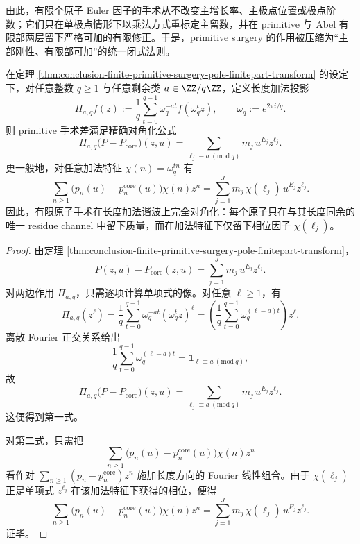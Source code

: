 \noindent
由此，有限个原子 Euler 因子的手术从不改变主增长率、主极点位置或极点阶数；它们只在单极点情形下以乘法方式重标定主留数，并在 primitive 与 Abel 有限部两层留下严格可加的有限修正。于是，primitive surgery 的作用被压缩为“主部刚性、有限部可加”的统一闭式法则。

\begin{theorem}[有限原子手术在长度加法谐波上的完全对角化]\label{thm:conclusion-finite-primitive-surgery-additive-harmonic-diagonalization}
在定理 \ref{thm:conclusion-finite-primitive-surgery-pole-finitepart-transform} 的设定下，对任意整数 \(q\ge 1\) 与任意剩余类 \(a\in \ZZ/q\ZZ\)，定义长度加法投影
\[
\Pi_{a,q}f(z):=\frac{1}{q}\sum_{t=0}^{q-1}\omega_q^{-at}f(\omega_q^t z),
\qquad
\omega_q:=e^{2\pi i/q}.
\]
则 primitive 手术差满足精确对角化公式
\[
\Pi_{a,q}\!\bigl(P-P_{\mathrm{core}}\bigr)(z,u)
=
\sum_{\ell_j\equiv a\ (\mathrm{mod}\ q)}m_j\,u^{E_j}z^{\ell_j}.
\]
更一般地，对任意加法特征 \(\chi(n)=\omega_q^{tn}\) 有
\[
\sum_{n\ge 1}\bigl(p_n(u)-p_n^{\mathrm{core}}(u)\bigr)\chi(n)z^n
=
\sum_{j=1}^{J}m_j\,\chi(\ell_j)\,u^{E_j}z^{\ell_j}.
\]
因此，有限原子手术在长度加法谐波上完全对角化：每个原子只在与其长度同余的唯一 residue channel 中留下质量，而在加法特征下仅留下相位因子 \(\chi(\ell_j)\)。
\end{theorem}
\begin{proof}
由定理 \ref{thm:conclusion-finite-primitive-surgery-pole-finitepart-transform}，
\[
P(z,u)-P_{\mathrm{core}}(z,u)=\sum_{j=1}^{J}m_j\,u^{E_j}z^{\ell_j}.
\]
对两边作用 \(\Pi_{a,q}\)，只需逐项计算单项式的像。对任意 \(\ell\ge 1\)，有
\[
\Pi_{a,q}(z^\ell)
=
\frac{1}{q}\sum_{t=0}^{q-1}\omega_q^{-at}(\omega_q^t z)^\ell
=
\left(\frac{1}{q}\sum_{t=0}^{q-1}\omega_q^{(\ell-a)t}\right)z^\ell.
\]
离散 Fourier 正交关系给出
\[
\frac{1}{q}\sum_{t=0}^{q-1}\omega_q^{(\ell-a)t}
=
\mathbf 1_{\ell\equiv a\ (\mathrm{mod}\ q)},
\]
故
\[
\Pi_{a,q}\!\bigl(P-P_{\mathrm{core}}\bigr)(z,u)
=
\sum_{\ell_j\equiv a\ (\mathrm{mod}\ q)}m_j\,u^{E_j}z^{\ell_j}.
\]
这便得到第一式。

对第二式，只需把
\[
\sum_{n\ge 1}\bigl(p_n(u)-p_n^{\mathrm{core}}(u)\bigr)\chi(n)z^n
\]
看作对 \(\sum_{n\ge 1}(p_n-p_n^{\mathrm{core}})z^n\) 施加长度方向的 Fourier 线性组合。由于 \(\chi(\ell_j)\) 正是单项式 \(z^{\ell_j}\) 在该加法特征下获得的相位，便得
\[
\sum_{n\ge 1}\bigl(p_n(u)-p_n^{\mathrm{core}}(u)\bigr)\chi(n)z^n
=
\sum_{j=1}^{J}m_j\,\chi(\ell_j)\,u^{E_j}z^{\ell_j}.
\]
证毕。
\end{proof}

